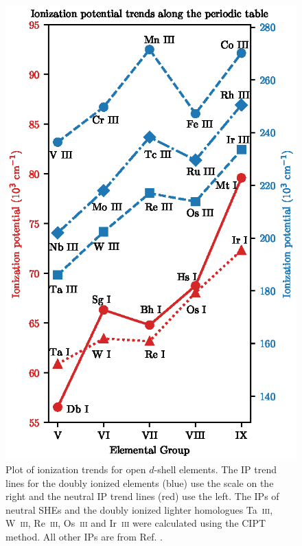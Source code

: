 \documentclass[10pt,a4paper, twoside, openright]{report}
\begin{document}
\begin{figure}
\centering
\includegraphics[scale=1.20]{./figures/Ionization_Plot.eps}
\caption[Ionization trends for open $d$-shell elements.]{Plot of ionization trends for open $d$-shell elements. The IP trend lines for the doubly ionized elements (blue) use the scale on the right and the neutral IP trend lines (red) use the left. The IPs of neutral SHEs and the doubly ionized lighter homologues Ta~\textsc{iii}, W~\textsc{iii}, Re~\textsc{iii}, Os~\textsc{iii} and Ir~\textsc{iii} were calculated using the CIPT method. All other IPs are from Ref. \cite{NIST_ASD}. \label{fig:IPPlot}}
\end{figure}
\end{document}
